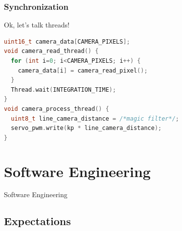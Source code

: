 \documentclass{beamer}
\begin{document}
\begin{frame}[fragile]
\frametitle{Synchronization}
Ok, let's talk threads!
\vspace{10px}
\begin{lstlisting}[language=C++,basicstyle=\ttfamily\scriptsize]
uint16_t camera_data[CAMERA_PIXELS];
void camera_read_thread() {
  for (int i=0; i<CAMERA_PIXELS; i++) {
    camera_data[i] = camera_read_pixel();
  }
  Thread.wait(INTEGRATION_TIME);
}
void camera_process_thread() {
  uint8_t line_camera_distance = /*magic filter*/;
  servo_pwm.write(kp * line_camera_distance);
}
\end{lstlisting}
\vspace{10px}
\end{frame}

\section{Software Engineering} %
\begin{frame}
\centering \huge Software Engineering
\end{frame}

\subsection{Expectations}
\end{document}

